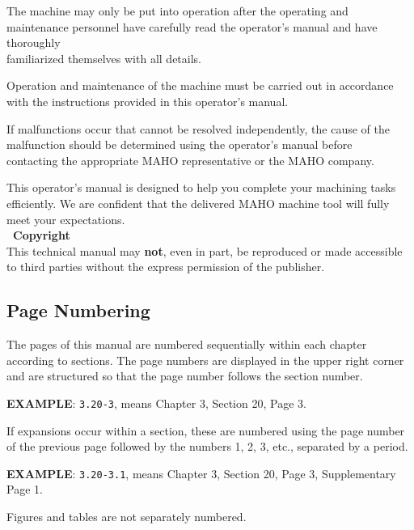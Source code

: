 The machine may only be put into operation after the operating and maintenance personnel have carefully read the operator's manual and have thoroughly\\ familiarized themselves with all details.

Operation and maintenance of the machine must be carried out in accordance with the instructions provided in this operator's manual.


If malfunctions occur that cannot be resolved independently, the cause of the malfunction should be determined using the operator's manual before \\contacting the appropriate MAHO representative or the MAHO company.

This operator's manual is designed to help you complete your machining tasks efficiently. We are confident that the delivered MAHO machine tool will fully meet your expectations. \\[1cm]

\noindent
\textbf{\textcopyright\ Copyright} \\[0.2cm]

This technical manual may \textbf{not}, even in part, be reproduced or made accessible to third parties without the express permission of the publisher.

\newpage

\subsection{Page Numbering}

The pages of this manual are numbered sequentially within each chapter \\according to sections. The page numbers are displayed in the upper right corner and are structured so that the page number follows the section number.

\textbf{EXAMPLE}: \texttt{3.20-3}, means Chapter 3, Section 20, Page 3.

If expansions occur within a section, these are numbered using the page number of the previous page followed by the numbers 1, 2, 3, etc., separated by a period.

\textbf{EXAMPLE}: \texttt{3.20-3.1}, means Chapter 3, Section 20, Page 3, Supplementary Page 1.

Figures and tables are not separately numbered.

